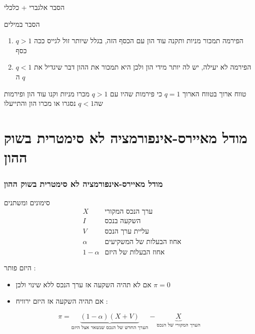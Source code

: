 \documentclass[usenames,dvipsnames]{beamer}
\begin{document}
\begin{RTL}
\begin{frame}[allowframebreaks]
\begin{block}{הסבר אלגברי + כלכלי}
    \end{block}
    \begin{block}{הסבר במילים}
        \begin{enumerate}
            \item $q>1$ הפירמה תמכור מניות ותקנה עוד הון עם הכסף הזה, בגלל שיותר זול לגייס ככה כסף
            \item $q<1$ הפירמה לא יעילה, יש לה יותר מידי הון ולכן היא תמכור את ההון דבר שיגדיל את ה $q$ 
        \end{enumerate}
    \end{block}
   

    \begin{alertblock}{טווח ארוך}
        בטווח הארוך $q=1$ כי פירמות שהיו עם $q>1$ מכרו מניות וקנו עוד הון  ופירמות שה$q<1$ נסגרו או מכרו הון והתייעלו
    \end{alertblock}
\end{frame}
\section{מודל מאיירס-אינפורמציה לא סימטרית בשוק ההון}
\begin{frame}[allowframebreaks]
    \frametitle{מודל מאיירס-אינפורמציה לא סימטרית בשוק ההון}
    \begin{block}{סימונים ומשתנים}
        \begin{align*}
             & X & \text{ערך הנכס המקורי} \\ & I & \text{השקעה בנכס} \\ & V & \text{עליית ערך הנכס} \\ & \alpha & \text{אחוז הבעלות של המשקיעים} \\ & 1-\alpha & \text{אחוז הבעלות של היזם}
         \end{align*}
    \end{block}
    \framebreak
    היזם פותר :
    \begin{itemize}
        \item אם לא תהיה השקעה אז ערך הנכס ללא שינוי ולכן $\pi = 0$
        \item אם תהיה השקעה אז היזם ירוויח : 
    \end{itemize}
    $$\pi = \underbrace{(1-\alpha)\left(X+V\right)}_{\text{הערך החדש של הנכס שנשאר אצל היזם}} - \underbrace{X}_{\text{הערך המקורי של הנכס}}$$
    

\end{frame}
\end{RTL}
\end{document}
